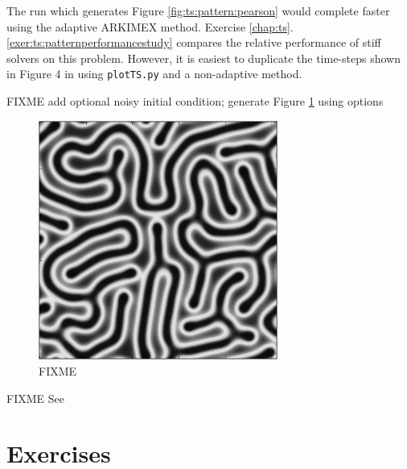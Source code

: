The run which generates Figure \ref{fig:ts:pattern:pearson} would complete faster using the adaptive ARKIMEX method.  Exercise \ref{chap:ts}.\ref{exer:ts:patternperformancestudy} compares the relative performance of stiff solvers on this problem.  However, it is easiest to duplicate the time-steps shown in Figure 4 in \citet{Pearson1993} using \texttt{plotTS.py} and a non-adaptive method.  

FIXME add optional noisy initial condition; generate Figure \ref{fig:ts:pattern:snakes} using options

\begin{figure}
\includegraphics[width=0.7\textwidth]{figs/snakes}
\caption{FIXME}
\label{fig:ts:pattern:snakes}
\end{figure}

FIXME See 


\section{Exercises}


